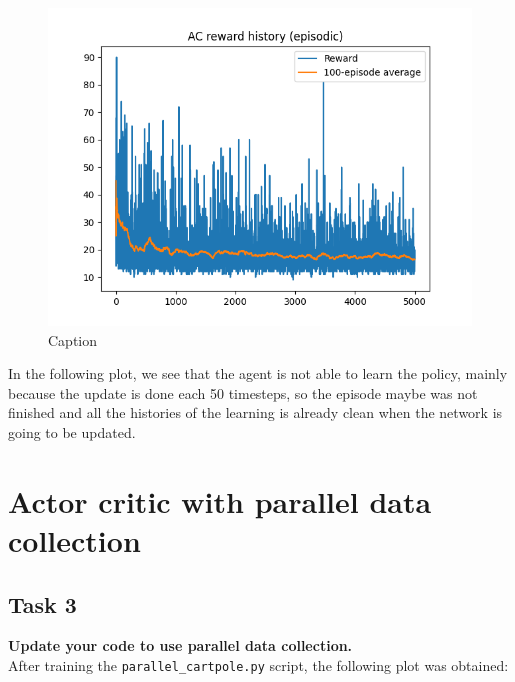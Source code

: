 \documentclass[12pt]{article}
\begin{document}
\begin{figure}[ht]
    \centering
    \includegraphics[scale=0.5]{exercise-6/plots/task-2.png}
    \caption{Caption}
    \label{fig:task-2}
\end{figure}

In the following plot, we see that the agent is not able to learn the policy, mainly because the update is done each 50 timesteps, so the episode maybe was not finished and all the histories of the learning is already clean when the network is going to be updated.

\section{Actor critic with parallel data collection}

\subsection{Task 3}
\textbf{Update your code to use parallel data collection.}\\

After training the \texttt{parallel\_cartpole.py} script, the following plot was obtained:
\end{document}
